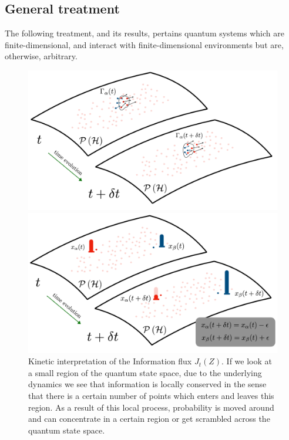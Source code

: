 \documentclass[draft,nofootinbib,pre,twocolumn,showpacs,showkeys,preprintnumbers,floatfix]{revtex4-1}
\newcommand{\1}{\mathbbm{1}}
\begin{document}
\subsection*{General treatment}
The following treatment, and its results, pertains quantum systems which are finite-dimensional, 
and interact with finite-dimensional environments but are, otherwise, arbitrary. 
\begin{figure}[t!]
\centering
\begin{minipage}[t]{.45\textwidth}
\includegraphics[width=\textwidth]{./img/Flux.pdf}
\caption{Kinetic interpretation of the Information flux $J_t(Z)$. If we look at a small region of the 
	quantum state space,  due to the underlying dynamics we see that information is locally conserved 
	in the sense that there is a certain number of points which enters and leaves this region. As a 
	result of this local process, probability is moved around and can concentrate in a certain region 
	or get scrambled across the quantum state space.
	}
\label{fig:flux_term}
\end{minipage}\hfill
\begin{minipage}[t]{.45\textwidth}
\includegraphics[width=\textwidth]{./img/Source.pdf}

\end{minipage}
\end{figure}
\end{document}
